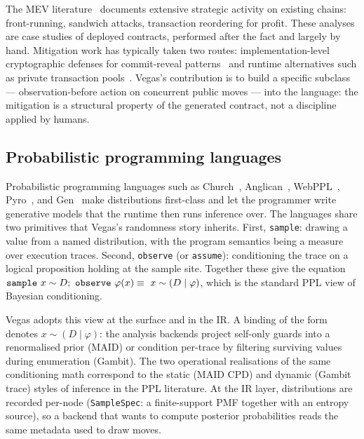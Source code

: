 The MEV literature~\citep{Daian2020Flash,qin2022quantifying}
documents extensive strategic activity on existing chains:
front-running, sandwich attacks, transaction reordering for
profit.  These analyses are case studies of deployed contracts,
performed after the fact and largely by hand.  Mitigation work
has typically taken two routes: implementation-level cryptographic
defenses for commit-reveal patterns~\citep{breidenbach2018enter}
and runtime alternatives such as private transaction
pools~\citep{Weintraub2022FlashbotsAuction}.  Vegas's
contribution is to build a specific subclass --- observation-before
action on concurrent public moves --- into the language: the
mitigation is a structural property of the generated contract,
not a discipline applied by humans.

\subsection{Probabilistic programming languages}
\label{sec:related:ppl}

Probabilistic programming languages such as
Church~\citep{Goodman2008Church},
Anglican~\citep{wood2014anglican},
WebPPL~\citep{Goodman2014WebPPL},
Pyro~\citep{Bingham2019Pyro}, and
Gen~\citep{cusumano2019gen}
make distributions first-class and let the programmer write
generative models that the runtime then runs inference over.  The
languages share two primitives that Vegas's randomness story
inherits.  First, \texttt{sample}: drawing a value from a
named distribution, with the program semantics being a measure
over execution traces.  Second, \texttt{observe} (or
\texttt{assume}): conditioning the trace on a logical
proposition holding at the sample site.  Together these give
the equation \(\texttt{sample}\ x\sim D;\ \texttt{observe}\ \varphi(x)
\equiv\ x\sim (D \mid \varphi)\), which is the standard
PPL view of Bayesian conditioning.

Vegas adopts this view at the surface and in the IR.  A binding
of the form  denotes
\(x \sim (D \mid \varphi)\): the analysis backends project
self-only guards into a renormalised prior (MAID) or condition
per-trace by filtering surviving values during enumeration
(Gambit).  The two operational realisations of the same
conditioning math correspond to the static (MAID CPD) and
dynamic (Gambit trace) styles of inference in the PPL
literature.  At the IR layer, distributions are recorded
per-node (\texttt{SampleSpec}: a finite-support PMF together
with an entropy source), so a backend that wants to compute
posterior probabilities reads the same metadata used to draw
moves.

